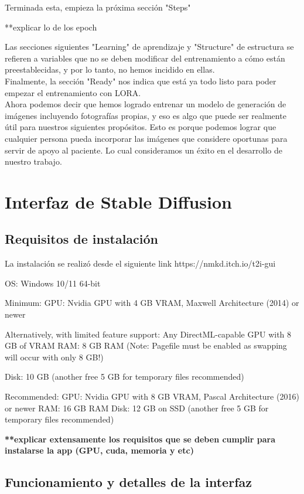 Terminada esta, empieza la próxima sección "Steps" 

**explicar lo de los epoch 


Las secciones siguientes "Learning" de aprendizaje y "Structure" de estructura se refieren a variables que no se deben modificar del entrenamiento a cómo están preestablecidas, y por lo tanto, no hemos incidido en ellas.\\ 

Finalmente, la sección "Ready" nos indica que está ya todo listo para poder empezar el entrenamiento con LORA. \\

Ahora podemos decir que hemos logrado entrenar un modelo de generación de imágenes incluyendo fotografías propias, y eso es algo que puede ser realmente útil para nuestros siguientes propósitos. Esto es porque podemos lograr que cualquier persona pueda incorporar las imágenes que considere oportunas para servir de apoyo al paciente. Lo cual consideramos un éxito en el desarrollo de nuestro trabajo. 


\section{Interfaz de Stable Diffusion}

\subsection{Requisitos de instalación}

La instalación se realizó desde el siguiente link 
https://nmkd.itch.io/t2i-gui

OS: Windows 10/11 64-bit

Minimum:
GPU: Nvidia GPU with 4 GB VRAM, Maxwell Architecture (2014) or newer

Alternatively, with limited feature support: Any DirectML-capable GPU with 8 GB of VRAM
RAM: 8 GB RAM (Note: Pagefile must be enabled as swapping will occur with only 8 GB!)

Disk: 10 GB (another free 5 GB for temporary files recommended)

Recommended:
GPU: Nvidia GPU with 8 GB VRAM, Pascal Architecture (2016) or newer
RAM: 16 GB RAM
Disk: 12 GB on SSD (another free 5 GB for temporary files recommended)

\textbf{**explicar extensamente los requisitos que se deben cumplir para instalarse la app (GPU, cuda, memoria y etc)}

\subsection{Funcionamiento y detalles de la interfaz}

